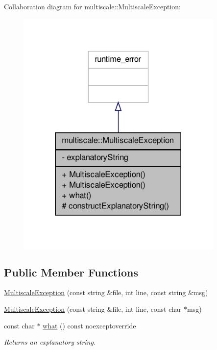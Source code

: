 Collaboration diagram for multiscale\-:\-:Multiscale\-Exception\-:\nopagebreak
\begin{figure}[H]
\begin{center}
\leavevmode
\includegraphics[width=290pt]{classmultiscale_1_1MultiscaleException__coll__graph}
\end{center}
\end{figure}
\subsection*{Public Member Functions}
\begin{DoxyCompactItemize}
\item 
\hyperlink{classmultiscale_1_1MultiscaleException_a6eb7d129f239cc1c4f497b1bbaf94fa5}{Multiscale\-Exception} (const string \&file, int line, const string \&msg)
\item 
\hyperlink{classmultiscale_1_1MultiscaleException_a3c0023538ce22fcd663b98a39b12d5a5}{Multiscale\-Exception} (const string \&file, int line, const char $\ast$msg)
\item 
const char $\ast$ \hyperlink{classmultiscale_1_1MultiscaleException_a2750c3e86e792919a8a4323b83800530}{what} () const noexceptoverride
\begin{DoxyCompactList}\small\item\em Returns an explanatory string. \end{DoxyCompactList}\end{DoxyCompactItemize}
